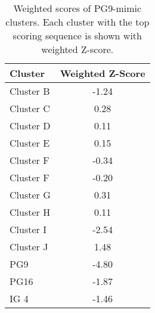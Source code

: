 \begin{table}
\centering
\begin{tabular}{lc}
\textbf{Cluster}   & \textbf{Weighted Z-Score} \\
\hline
Cluster B & -1.24            \\
Cluster C & 0.28             \\
Cluster D & 0.11             \\
Cluster E & 0.15             \\
Cluster F & -0.34            \\
Cluster F & -0.20            \\
Cluster G & 0.31             \\
Cluster H & 0.11             \\
Cluster I & -2.54            \\
Cluster J & 1.48             \\
PG9       & -4.80            \\
PG16      & -1.87            \\
IG 4      & -1.46           
\end{tabular}
\caption[Weighted Scores of PG9-Mimic Clusters]{Weighted scores of PG9-mimic clusters. Each cluster with the top scoring sequence is shown with weighted Z-score.}
\end{table}